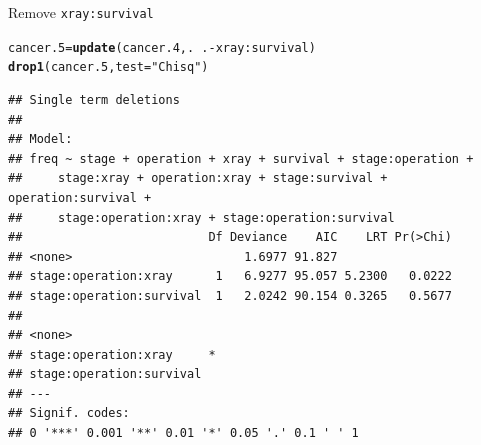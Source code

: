 \documentclass[unknownkeysallowed]{beamer}\usepackage[]{graphicx}\usepackage[]{color}
\makeatletter
\newcommand{\hlstr}[1]{\textcolor[rgb]{0.192,0.494,0.8}{#1}}%
\newcommand{\hlopt}[1]{\textcolor[rgb]{0,0,0}{#1}}%
\newcommand{\hlstd}[1]{\textcolor[rgb]{0.345,0.345,0.345}{#1}}%
\newcommand{\hlkwb}[1]{\textcolor[rgb]{0.69,0.353,0.396}{#1}}%
\newcommand{\hlkwc}[1]{\textcolor[rgb]{0.333,0.667,0.333}{#1}}%
\newcommand{\hlkwd}[1]{\textcolor[rgb]{0.737,0.353,0.396}{\textbf{#1}}}%
\newenvironment{kframe}{%
 \def\at@end@of@kframe{}%
 \ifinner\ifhmode%
  \def\at@end@of@kframe{\end{minipage}}%
  \begin{minipage}{\columnwidth}%
 \fi\fi%
 \def\FrameCommand##1{\hskip\@totalleftmargin \hskip-\fboxsep
 \colorbox{shadecolor}{##1}\hskip-\fboxsep
     \hskip-\linewidth \hskip-\@totalleftmargin \hskip\columnwidth}%
 \MakeFramed {\advance\hsize-\width
   \@totalleftmargin\z@ \linewidth\hsize
   \@setminipage}}%
 {\par\unskip\endMakeFramed%
 \at@end@of@kframe}
\newenvironment{knitrout}{}{} %
\makeatother
\begin{document}
\begin{frame}[fragile]{Remove \texttt{xray:survival}}
  
\begin{knitrout}\scriptsize
{}\color{fgcolor}\begin{kframe}
\begin{alltt}
\hlstd{cancer.5}\hlkwb{=}\hlkwd{update}\hlstd{(cancer.4,.}\hlopt{~}\hlstd{.}\hlopt{-}\hlstd{xray}\hlopt{:}\hlstd{survival)}
\hlkwd{drop1}\hlstd{(cancer.5,}\hlkwc{test}\hlstd{=}\hlstr{"Chisq"}\hlstd{)}
\end{alltt}
\begin{verbatim}
## Single term deletions
## 
## Model:
## freq ~ stage + operation + xray + survival + stage:operation + 
##     stage:xray + operation:xray + stage:survival + operation:survival + 
##     stage:operation:xray + stage:operation:survival
##                          Df Deviance    AIC    LRT Pr(>Chi)
## <none>                        1.6977 91.827                
## stage:operation:xray      1   6.9277 95.057 5.2300   0.0222
## stage:operation:survival  1   2.0242 90.154 0.3265   0.5677
##                           
## <none>                    
## stage:operation:xray     *
## stage:operation:survival  
## ---
## Signif. codes:  
## 0 '***' 0.001 '**' 0.01 '*' 0.05 '.' 0.1 ' ' 1
\end{verbatim}
\end{kframe}
\end{knitrout}
  
  
\end{frame}
\end{document}
